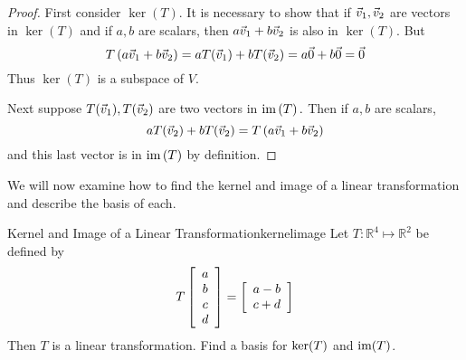 \begin{proof}
First consider $\ker \left( T\right) .$ It is necessary to
show that if $\vec{v}_{1},\vec{v}_{2}$ are vectors in $\ker \left( T\right) $
and if $a,b$ are scalars, then $a\vec{v}_{1}+b\vec{v}_{2}$ is also in $\ker
\left( T\right) .$ But 
\begin{equation*}
T\left( a\vec{v}_{1}+b\vec{v}_{2}\right) =aT(\vec{v}_{1})+bT(\vec{v}_{2})=a\vec{0}+b\vec{0}=\vec{0}
\end{equation*}
Thus $\ker \left( T\right) $ is a subspace of $V$.

Next suppose $T(\vec{v}_{1}),T(\vec{v}_{2})$ are two vectors in $\mbox{im}\left(
T\right) .$ Then if $a,b$ are scalars, 
\begin{equation*}
aT(\vec{v}_{2})+bT(\vec{v}_{2})=T\left( a\vec{v}_{1}+b\vec{v}_{2}\right)
\end{equation*}
and this last vector is in $\mbox{im}\left( T\right) $ by definition. 
\end{proof}

We will now examine how to find the kernel and image of a linear transformation and describe the basis of each. 

\begin{example}{Kernel and Image of a Linear Transformation}{kernelimage}
Let $T: \mathbb{R}^4 \mapsto \mathbb{R}^2$ be defined by
\[
T \left[ \begin{array}{c}
a \\
b \\
c \\
d
\end{array} \right] = 
\left[ \begin{array}{c}
a - b \\ 
c + d
\end{array} \right]
\]
Then $T$ is a linear transformation. Find a basis for $\mbox{ker}(T)$ and $\mbox{im}(T)$. 
\end{example}

